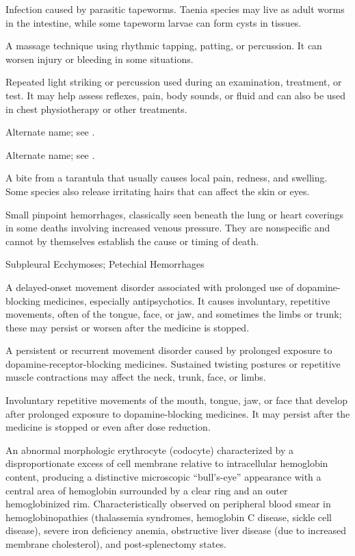 Infection caused by parasitic tapeworms. Taenia species may live as adult worms in the intestine, while some tapeworm larvae can form cysts in tissues.

 A massage technique using rhythmic tapping, patting, or percussion. It can worsen injury or bleeding in some situations.

 Repeated light striking or percussion used during an examination, treatment, or test. It may help assess reflexes, pain, body sounds, or fluid and can also be used in chest physiotherapy or other treatments.

 Alternate name; see .

 Alternate name; see .

 A bite from a tarantula that usually causes local pain, redness, and swelling. Some species also release irritating hairs that can affect the skin or eyes.

 Small pinpoint hemorrhages, classically seen beneath the lung or heart coverings in some deaths involving increased venous pressure. They are nonspecific and cannot by themselves establish the cause or timing of death.

\synonyms
Subpleural Ecchymoses; Petechial Hemorrhages

 A delayed-onset movement disorder associated with prolonged use of dopamine-blocking medicines, especially antipsychotics. It causes involuntary, repetitive movements, often of the tongue, face, or jaw, and sometimes the limbs or trunk; these may persist or worsen after the medicine is stopped.

 A persistent or recurrent movement disorder caused by prolonged exposure to dopamine-receptor-blocking medicines. Sustained twisting postures or repetitive muscle contractions may affect the neck, trunk, face, or limbs.

 Involuntary repetitive movements of the mouth, tongue, jaw, or face that develop after prolonged exposure to dopamine-blocking medicines. It may persist after the medicine is stopped or even after dose reduction.

 An abnormal morphologic erythrocyte (codocyte) characterized by a disproportionate excess of cell membrane relative to intracellular hemoglobin content, producing a distinctive microscopic ``bull's-eye'' appearance with a central area of hemoglobin surrounded by a clear ring and an outer hemoglobinized rim. Characteristically observed on peripheral blood smear in hemoglobinopathies (thalassemia syndromes, hemoglobin C disease, sickle cell disease), severe iron deficiency anemia, obstructive liver disease (due to increased membrane cholesterol), and post-splenectomy states.

